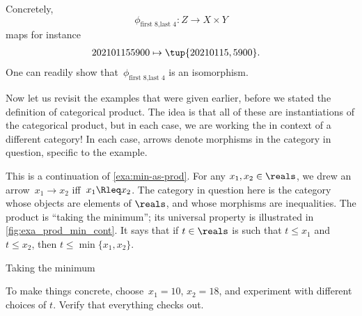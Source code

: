\begin{example}
    Concretely,~
    \begin{equation}
        \label{eq:exa-univ-iso}
        \phi_{\text{first 8},\text{last 4}}: Z \to X\times Y
    \end{equation}
    maps for instance
    \begin{equation}
        \label{eq:exa-univ-iso-concrete}
        \begin{aligned}
            202101155900&\mapsto \tup{20210115,5900}.
        \end{aligned}
    \end{equation}
    One can readily show that~$\phi_{\text{first 8},\text{last 4}}$ is an isomorphism.
\end{example}

Now let us revisit the examples that were given earlier, before we stated the definition of categorical product.
The idea is that all of these are instantiations of the categorical product, but in each case, we are working the in context of a different category! In each case, arrows denote morphisms in the category in question, specific to the example.


\begin{example}
    \label{exa:min-as-prod-cont}
    This is a continuation of \cref{exa:min-as-prod}.
    For any $x_1,x_2\in \reals$, we drew an arrow~$x_1\to x_2$ iff~$x_1\Rleq x_2$.
    The category in question here is the category whose objects are elements of $\reals$, and whose morphisms are inequalities.
    The product is ``taking the minimum''; its universal property is illustrated in \cref{fig:exa_prod_min_cont}.
    It says that if $t \in \reals$ is such that $t \leq x_1$ and $t \leq x_2$, then $t \leq \min \{ x_1, x_2 \}$.
    \begin{marginfigure}
        \centering
        \caption{Taking the minimum}
        \label{fig:exa_prod_min_cont}
    \end{marginfigure}
    To make things concrete, choose~$x_1 = 10$, $x_2 = 18$, and experiment with different choices of $t$.
    Verify that everything checks out.
\end{example}

